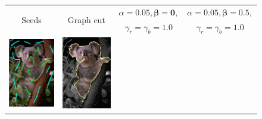 \begin{figure}
\center
\begin{tabular}{cccc}
\multirow{2}{*}{Seeds} & \multirow{2}{*}{Graph cut} & $\alpha=0.05, \boldsymbol{\beta=0},$ & $\alpha=0.05, \boldsymbol{\beta=0.5},$\\
& & $\gamma_r=\gamma_b=1.0$ & $\gamma_r=\gamma_b=1.0$\\
 	\includegraphics[scale=0.25]{figures/chapter8/segmentation/coala/k-0.0/seeds.png} & 
 	\includegraphics[scale=0.25]{figures/chapter8/segmentation/coala/k-0.0/gc-seg.png} &  	

\end{tabular}
\end{figure}
